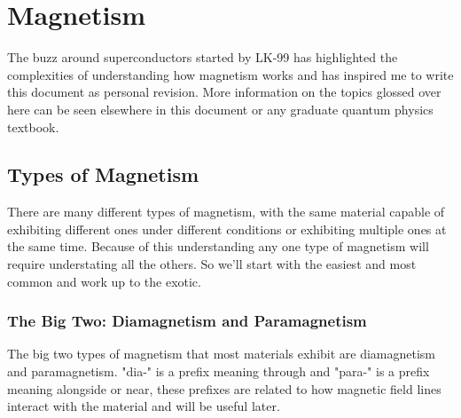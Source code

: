 
\section{Magnetism}
The buzz around superconductors started by LK-99 has highlighted the complexities of understanding how magnetism works and has inspired me to write this document as personal revision.
More information on the topics glossed over here can be seen elsewhere in this document or any graduate quantum physics textbook.

\subsection{Types of Magnetism}
There are many different types of magnetism, 
with the same material capable of exhibiting different ones under different conditions or exhibiting multiple ones at the same time. 
Because of this understanding any one type of magnetism will require understating all the others.
So we'll start with the easiest and most common and work up to the exotic.

\begin{center}
\end{center}

\subsubsection{The Big Two: Diamagnetism and Paramagnetism}
The big two types of magnetism that most materials exhibit are diamagnetism and paramagnetism.
"dia-" is a prefix meaning through and "para-" is a prefix meaning alongside or near, 
these prefixes are related to how magnetic field lines interact with the material and will be useful later.
\\

